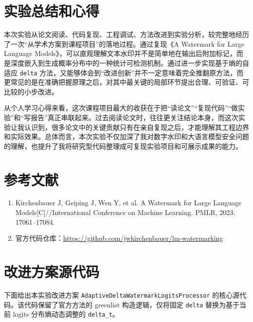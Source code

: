 \documentclass{SYSUReport}
\begin{document}
\section{实验总结和心得}

本次实验从论文阅读、代码复现、工程调试、方法改进到实验分析，较完整地经历了一次“从学术方案到课程项目”的落地过程。通过复现《A Watermark for Large Language Models》，可以直观理解文本水印并不是简单地在输出后附加标记，而是深度嵌入到生成概率分布中的一种统计可检测机制。通过进一步实现基于熵的自适应 \texttt{delta} 方法，又能够体会到“改进创新”并不一定意味着完全推翻原方法，而更常见的是在准确把握原理之后，对其中最关键的局部环节提出合理、可验证、可比较的小步改进。

从个人学习心得来看，这次课程项目最大的收获在于把“读论文”“复现代码”“做实验”和“写报告”真正串联起来。过去阅读论文时，往往更关注结论本身，而这次实验让我认识到，很多论文中的关键贡献只有在亲自复现之后，才能理解其工程边界和实际效果。总体而言，本次实验不仅加深了我对数字水印和大语言模型安全问题的理解，也提升了我将研究型代码整理成可复现实验项目和可展示成果的能力。

\section*{参考文献}

\begin{enumerate}
    \item Kirchenbauer J, Geiping J, Wen Y, et al. A Watermark for Large Language Models[C]//International Conference on Machine Learning. PMLR, 2023: 17061--17084.
    \item 官方代码仓库：\url{https://github.com/jwkirchenbauer/lm-watermarking}
\end{enumerate}

\appendix
\section{改进方案源代码}

下面给出本实验改进方案 \texttt{AdaptiveDeltaWatermarkLogitsProcessor} 的核心源代码。该代码保留了官方方法的 greenlist 构造逻辑，仅将固定 \texttt{delta} 替换为基于当前 logits 分布熵动态调整的 \texttt{delta\_t}。
\end{document}

